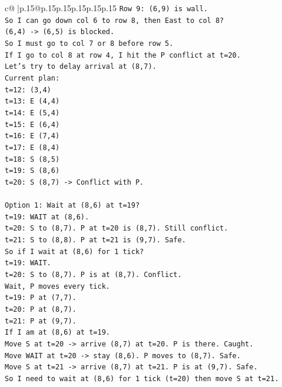 \documentclass{article}
\begin{document}
{\begin{supertabular}{c@{$\;$}|p{.15\linewidth}@{}p{.15\linewidth}p{.15\linewidth}p{.15\linewidth}p{.15\linewidth}p{.15\linewidth}}
{{{\texttt{Row 9: (6,9) is wall.} \\
\texttt{So I can go down col 6 to row 8, then East to col 8?} \\
\texttt{(6,4) {-}> (6,5) is blocked.} \\
\texttt{So I must go to col 7 or 8 before row 5.} \\
\texttt{If I go to col 8 at row 4, I hit the P conflict at t=20.} \\
\texttt{Let's try to delay arrival at (8,7).} \\
\texttt{Current plan:} \\
\texttt{t=12: (3,4)} \\
\texttt{t=13: E (4,4)} \\
\texttt{t=14: E (5,4)} \\
\texttt{t=15: E (6,4)} \\
\texttt{t=16: E (7,4)} \\
\texttt{t=17: E (8,4)} \\
\texttt{t=18: S (8,5)} \\
\texttt{t=19: S (8,6)} \\
\texttt{t=20: S (8,7) {-}> Conflict with P.} \\
\\ 
\texttt{Option 1: Wait at (8,6) at t=19?} \\
\texttt{t=19: WAIT at (8,6).} \\
\texttt{t=20: S to (8,7). P at t=20 is (8,7). Still conflict.} \\
\texttt{t=21: S to (8,8). P at t=21 is (9,7). Safe.} \\
\texttt{So if I wait at (8,6) for 1 tick?} \\
\texttt{t=19: WAIT.} \\
\texttt{t=20: S to (8,7). P is at (8,7). Conflict.} \\
\texttt{Wait, P moves every tick.} \\
\texttt{t=19: P at (7,7).} \\
\texttt{t=20: P at (8,7).} \\
\texttt{t=21: P at (9,7).} \\
\texttt{If I am at (8,6) at t=19.} \\
\texttt{Move S at t=20 {-}> arrive (8,7) at t=20. P is there. Caught.} \\
\texttt{Move WAIT at t=20 {-}> stay (8,6). P moves to (8,7). Safe.} \\
\texttt{Move S at t=21 {-}> arrive (8,7) at t=21. P is at (9,7). Safe.} \\
\texttt{So I need to wait at (8,6) for 1 tick (t=20) then move S at t=21.} \\
}}}
\end{supertabular}}
\end{document}

